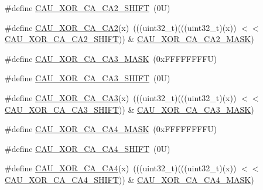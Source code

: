 \begin{DoxyCompactItemize}
\item 
\#define \mbox{\hyperlink{group___c_a_u___register___masks_gaaa37d49b203514cc1d0d59ef3dc5d4b0}{C\+A\+U\+\_\+\+X\+O\+R\+\_\+\+C\+A\+\_\+\+C\+A2\+\_\+\+S\+H\+I\+FT}}~(0\+U)
\item 
\#define \mbox{\hyperlink{group___c_a_u___register___masks_ga14a8b8358657a8eceb13d03a4204b01a}{C\+A\+U\+\_\+\+X\+O\+R\+\_\+\+C\+A\+\_\+\+C\+A2}}(x)~(((uint32\+\_\+t)(((uint32\+\_\+t)(x)) $<$$<$ \mbox{\hyperlink{group___c_a_u___register___masks_gaaa37d49b203514cc1d0d59ef3dc5d4b0}{C\+A\+U\+\_\+\+X\+O\+R\+\_\+\+C\+A\+\_\+\+C\+A2\+\_\+\+S\+H\+I\+FT}})) \& \mbox{\hyperlink{group___c_a_u___register___masks_ga710ad3a23664ea7f219a37d7a5402362}{C\+A\+U\+\_\+\+X\+O\+R\+\_\+\+C\+A\+\_\+\+C\+A2\+\_\+\+M\+A\+SK}})
\item 
\#define \mbox{\hyperlink{group___c_a_u___register___masks_gac7b046ce31fba66e970b3459c24a10f9}{C\+A\+U\+\_\+\+X\+O\+R\+\_\+\+C\+A\+\_\+\+C\+A3\+\_\+\+M\+A\+SK}}~(0x\+F\+F\+F\+F\+F\+F\+F\+F\+U)
\item 
\#define \mbox{\hyperlink{group___c_a_u___register___masks_ga524188c17d8d070ce35b78f3a1bd8d89}{C\+A\+U\+\_\+\+X\+O\+R\+\_\+\+C\+A\+\_\+\+C\+A3\+\_\+\+S\+H\+I\+FT}}~(0\+U)
\item 
\#define \mbox{\hyperlink{group___c_a_u___register___masks_ga1cabdcb13efdab3f163c0d3b605585f0}{C\+A\+U\+\_\+\+X\+O\+R\+\_\+\+C\+A\+\_\+\+C\+A3}}(x)~(((uint32\+\_\+t)(((uint32\+\_\+t)(x)) $<$$<$ \mbox{\hyperlink{group___c_a_u___register___masks_ga524188c17d8d070ce35b78f3a1bd8d89}{C\+A\+U\+\_\+\+X\+O\+R\+\_\+\+C\+A\+\_\+\+C\+A3\+\_\+\+S\+H\+I\+FT}})) \& \mbox{\hyperlink{group___c_a_u___register___masks_gac7b046ce31fba66e970b3459c24a10f9}{C\+A\+U\+\_\+\+X\+O\+R\+\_\+\+C\+A\+\_\+\+C\+A3\+\_\+\+M\+A\+SK}})
\item 
\#define \mbox{\hyperlink{group___c_a_u___register___masks_gac44f628ba27da8192d8e570f745e5a0d}{C\+A\+U\+\_\+\+X\+O\+R\+\_\+\+C\+A\+\_\+\+C\+A4\+\_\+\+M\+A\+SK}}~(0x\+F\+F\+F\+F\+F\+F\+F\+F\+U)
\item 
\#define \mbox{\hyperlink{group___c_a_u___register___masks_gad185523c9ec94202cae6663e3a76423f}{C\+A\+U\+\_\+\+X\+O\+R\+\_\+\+C\+A\+\_\+\+C\+A4\+\_\+\+S\+H\+I\+FT}}~(0\+U)
\item 
\#define \mbox{\hyperlink{group___c_a_u___register___masks_ga76d51795ea5635a4804f5b7ef4e4155c}{C\+A\+U\+\_\+\+X\+O\+R\+\_\+\+C\+A\+\_\+\+C\+A4}}(x)~(((uint32\+\_\+t)(((uint32\+\_\+t)(x)) $<$$<$ \mbox{\hyperlink{group___c_a_u___register___masks_gad185523c9ec94202cae6663e3a76423f}{C\+A\+U\+\_\+\+X\+O\+R\+\_\+\+C\+A\+\_\+\+C\+A4\+\_\+\+S\+H\+I\+FT}})) \& \mbox{\hyperlink{group___c_a_u___register___masks_gac44f628ba27da8192d8e570f745e5a0d}{C\+A\+U\+\_\+\+X\+O\+R\+\_\+\+C\+A\+\_\+\+C\+A4\+\_\+\+M\+A\+SK}})
$$
\end{DoxyCompactItemize}
